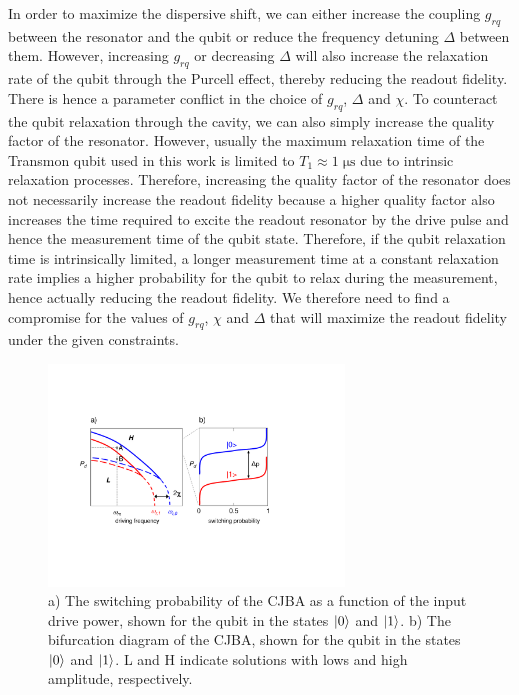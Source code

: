 In order to maximize the dispersive shift, we can either increase the coupling $g_{rq}$ between the resonator and the qubit or reduce the frequency detuning $\Delta$ between them. However, increasing $g_{rq}$ or decreasing $\Delta$ will also increase the relaxation rate of the qubit through the Purcell effect, thereby reducing the readout fidelity. There is hence a parameter conflict in the choice of $g_{rq}$, $\Delta$ and $\chi$. To counteract the qubit relaxation through the cavity, we can also simply increase the quality factor of the resonator. However, usually the maximum relaxation time of the Transmon qubit used in this work is limited to $T_1\approx 1\;\mathrm{\mu s}$ due to intrinsic relaxation processes. Therefore, increasing the quality factor of the resonator does not necessarily increase the readout fidelity because a higher quality factor also increases the time required to excite the readout resonator by the drive pulse and hence the measurement time of the qubit state. Therefore, if the qubit relaxation time is intrinsically limited, a longer measurement time at a constant relaxation rate implies a higher probability for the qubit to relax during the measurement, hence actually reducing the readout fidelity. We therefore need to find a compromise for the values of $g_{rq}$, $\chi$ and $\Delta$ that will maximize the readout fidelity under the given constraints.

\begin{figure}
	\includegraphics[width=0.7\textwidth]{./material/figures/2-qubit-processor/readout_principle}
	\caption[]{a) The switching probability of the CJBA as a function of the input drive power, shown for the qubit in the states $\left| 0 \right>$ and $\left| 1 \right>$. b) The bifurcation diagram of the CJBA, shown for the qubit in the states $\left| 0 \right>$ and $\left| 1 \right>$. L and H indicate solutions with lows and high amplitude, respectively.}
	\label{fig:readout_process_illustration}
\end{figure}

